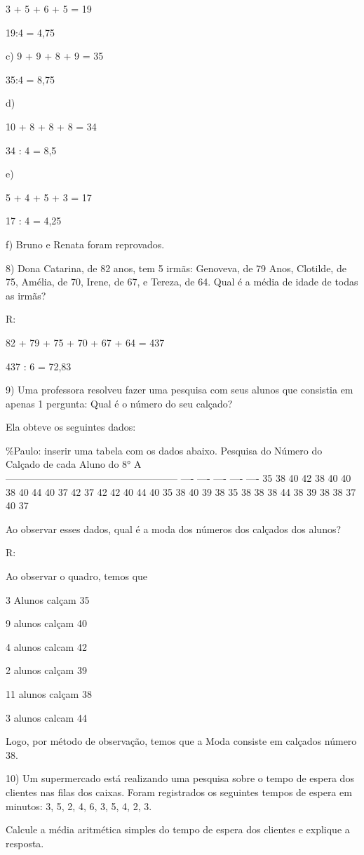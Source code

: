 3 + 5 + 6 + 5 = 19

19:4 = 4,75

c) 9 + 9 + 8 + 9 = 35

35:4 = 8,75

d)

10 + 8 + 8 + 8 = 34

34 : 4 = 8,5

e)

5 + 4 + 5 + 3 = 17

17 : 4 = 4,25

f) Bruno e Renata foram reprovados.

8) Dona Catarina, de 82 anos, tem 5 irmãs: Genoveva, de 79 Anos,
Clotilde, de 75, Amélia, de 70, Irene, de 67, e Tereza, de 64. Qual é a
média de idade de todas as irmãs?

R:

82 + 79 + 75 + 70 + 67 + 64 = 437

437 : 6 = 72,83

9) Uma professora resolveu fazer uma pesquisa com seus alunos que
consistia em apenas 1 pergunta: Qual é o número do seu calçado?

Ela obteve os seguintes dados:

\%Paulo: inserir uma tabela com os dados abaixo. Pesquisa do Número do
Calçado de cada Aluno do 8° A\\
----------------------------------------------------- ---- ---- ----
---- ---- 35 38 40 42 38 40 40 38 40 44 40 37 42 37 42 42 40 44 40 35 38
40 39 38 35 38 38 38 44 38 39 38 38 37 40 37

Ao observar esses dados, qual é a moda dos números dos calçados dos
alunos?

R:

Ao observar o quadro, temos que

3 Alunos calçam 35

9 alunos calçam 40

4 alunos calcam 42

2 alunos calçam 39

11 alunos calçam 38

3 alunos calcam 44

Logo, por método de observação, temos que a Moda consiste em calçados
número 38.

10) Um supermercado está realizando uma pesquisa sobre o tempo de espera
dos clientes nas filas dos caixas. Foram registrados os seguintes tempos
de espera em minutos: 3, 5, 2, 4, 6, 3, 5, 4, 2, 3.

Calcule a média aritmética simples do tempo de espera dos clientes e
explique a resposta.


